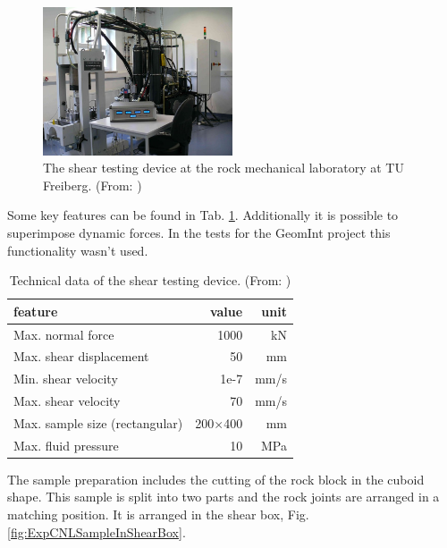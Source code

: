 \begin{figure}[!ht]
\begin{center}
\includegraphics[width=0.5\textwidth]{./figures/ExpShearMachine.jpg}
\end{center}
\caption{The shear testing device at the rock mechanical laboratory at TU Freiberg. (From: \cite{Konietzky2012})}
\label{fig:ExpCNLShearMachine}
\end{figure}

Some key features can be found in Tab. \ref{table:ExpCNLDeviceTechnicalData}. Additionally it is possible to superimpose dynamic forces. In the tests for the GeomInt project this functionality wasn't used.\\

\begin{table}[!ht]
\begin{center}
\begin{tabular}{l r r}
feature & value & unit\\
\hline
Max. normal force & 1000 & kN\\
Max. shear displacement & 50 &mm\\
Min. shear velocity & 1e-7 & mm/s\\
Max. shear velocity & 70 & mm/s\\
Max. sample size (rectangular) & 200$\times$400 & mm\\
Max. fluid pressure & 10 & MPa\\
\end{tabular}
\caption{Technical data of the shear testing device. (From: \cite{Konietzky2012})}
\label{table:ExpCNLDeviceTechnicalData}
\end{center}
\end{table}

The sample preparation includes the cutting of the rock block in the cuboid shape. This sample is split into two parts and the rock joints are arranged in a matching position. It is arranged in the shear box, Fig. \ref{fig:ExpCNLSampleInShearBox}.\\


